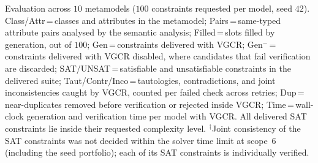 \begin{table}[t]
\caption{Evaluation across $10$ metamodels ($100$ constraints requested per model, seed $42$). Class/Attr\,=\,classes and attributes in the metamodel; Pairs\,=\,same-typed attribute pairs analysed by the semantic analysis; Filled\,=\,slots filled by generation, out of $100$; Gen\,=\,constraints delivered with VGCR; Gen$^{-}$\,=\,constraints delivered with VGCR disabled, where candidates that fail verification are discarded; SAT/UNSAT\,=\,satisfiable and unsatisfiable constraints in the delivered suite; Taut/Contr/Inco\,=\,tautologies, contradictions, and joint inconsistencies caught by VGCR, counted per failed check across retries; Dup\,=\,near-duplicates removed before verification or rejected inside VGCR; Time\,=\,wall-clock generation and verification time per model with VGCR. All delivered SAT constraints lie inside their requested complexity level. $^{\dagger}$Joint consistency of the SAT constraints was not decided within the solver time limit at scope~6 (including the seed portfolio); each of its SAT constraints is individually verified.}
\label{tab:models}
\end{table}
